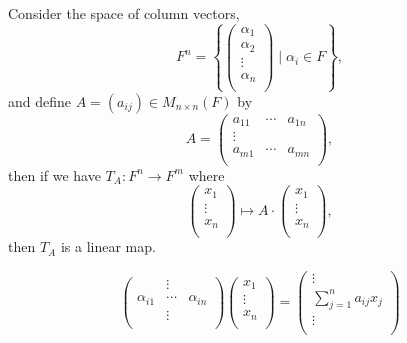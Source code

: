 \begin{eg}
    Consider the space of column vectors,
    \[
        F^n = \left\{ \begin{pmatrix}
             \alpha _1 \\
              \alpha _2\\
              \vdots\\
              \alpha _n\\
        \end{pmatrix}  \mid \alpha _i \in F\right\}, 
    \] and define \(A = \left( a_{ij}  \right) \in M_{n \times n}(F) \) by
    \[
        A = \begin{pmatrix}
            a_{11}  & \cdots & a_{1n}  \\
            \vdots &  &   \\
             a_{m1} & \cdots & a_{mn}  \\
        \end{pmatrix},
    \] then if we have \(T_A: F^n \to F^m\) where
    \[
        \begin{pmatrix}
             x_1 \\
             \vdots \\
             x_n \\
        \end{pmatrix} \mapsto A \cdot \begin{pmatrix}
             x_1 \\
             \vdots \\
             x_n \\
        \end{pmatrix},
    \] then \(T_A\) is a linear map. 

    \begin{note}
        \[
            \begin{pmatrix}
                 & \vdots &   \\
                \alpha _{i1} & \cdots & \alpha _{in}  \\
                 & \vdots &   \\
            \end{pmatrix}
            \begin{pmatrix}
                 x_1 \\
                 \vdots \\
                 x_n \\
            \end{pmatrix} = 
            \begin{pmatrix}
                 \vdots \\
                  \sum_{j=1}^n a_{ij} x_j  \\
                  \vdots \\
            \end{pmatrix}
        \]
    \end{note}
\end{eg}

